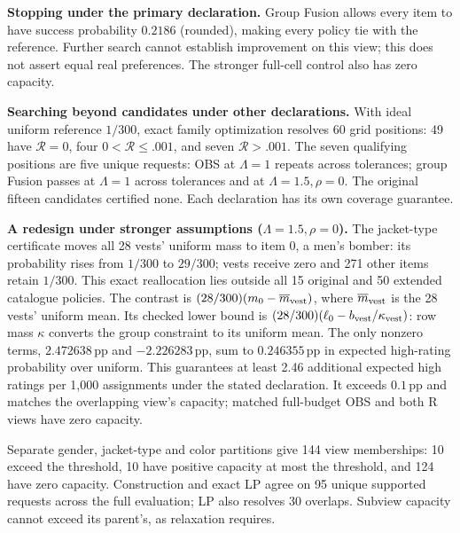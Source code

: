 \textbf{Stopping under the primary declaration.}
Group Fusion allows every item to have success probability $0.2186$ (rounded), making every policy tie with the reference. Further search cannot establish improvement on this view; this does not assert equal real preferences. The stronger full-cell control also has zero capacity.

\textbf{Searching beyond candidates under other declarations.}
With ideal uniform reference $1/300$, exact family optimization resolves
60 grid positions: 49 have $\mathcal R=0$, four $0<\mathcal R\le.001$,
and seven $\mathcal R>.001$.
The seven qualifying positions are five unique requests: OBS at $\Lambda=1$ repeats across tolerances; group Fusion passes at $\Lambda=1$ across tolerances and at $\Lambda=1.5,\rho=0$.
The original fifteen candidates certified none. Each declaration has its own coverage guarantee.

\textbf{A redesign under stronger assumptions ($\Lambda=1.5,\rho=0$).}
The jacket-type certificate moves all 28 vests' uniform mass to item 0,
a men's bomber: its probability rises from $1/300$ to $29/300$;
vests receive zero and 271 other items retain $1/300$.
This exact reallocation lies outside all 15 original and 50 extended catalogue policies. The contrast is
$(28/300)(m_0-\overline m_{\rm vest})$, where $\overline m_{\rm vest}$ is
the 28 vests' uniform mean. Its checked lower bound is
$(28/300)(\ell_0-b_{\rm vest}/\kappa_{\rm vest})$:
row mass $\kappa$ converts the group constraint to its uniform mean.
The only nonzero terms, $2.472638$\,pp and $-2.226283$\,pp, sum to
$0.246355$\,pp in expected high-rating probability over uniform.
This guarantees at least 2.46 additional expected high ratings per 1,000 assignments under the stated declaration. It exceeds $0.1$\,pp and matches the overlapping view's capacity; matched full-budget OBS and both R views have zero capacity.

Separate gender, jacket-type and color partitions give 144 view memberships:
10 exceed the threshold, 10 have positive capacity at most the threshold,
and 124 have zero capacity. Construction and exact LP agree on 95 unique
supported requests across the full evaluation; LP also resolves 30 overlaps.
Subview capacity cannot exceed its parent's, as relaxation requires.

